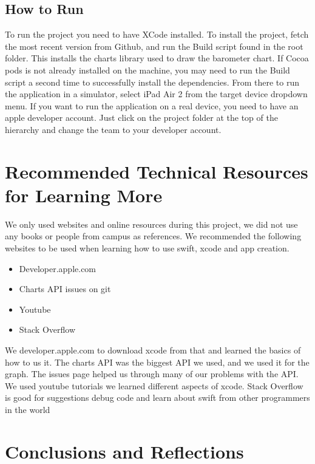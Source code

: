 \documentclass[onecolumn, draftclsnofoot,10pt, compsoc]{IEEEtran}
\begin{document}
\subsection{How to Run}
To run the project you need to have XCode installed.
To install the project, fetch the most recent version from Github, and run the Build script found in the root folder.
This installs the charts library used to draw the barometer chart.
If Cocoa pods is not already installed on the machine, you may need to run the Build script a second time to successfully install the dependencies.
From there to run the application in a simulator, select iPad Air 2 from the target device dropdown menu.
If you want to run the application on a real device, you need to have an apple developer account.
Just click on the project folder at the top of the hierarchy and change the team to your developer account.

\section{Recommended Technical Resources for Learning More}
We only used websites and online resources during this project, we did not use any books or people from campus as references. We recommended the following websites to be used when learning how to use swift, xcode and app creation. 


\begin{itemize}
	\item Developer.apple.com
	\item Charts API issues on git
	\item Youtube 
	\item Stack Overflow
\end{itemize}

    
    We developer.apple.com to download xcode from that and learned the basics of how to us it.
    The charts API was the biggest API we used, and we used it for the graph.
    The issues page helped us through many of our problems with the API.
    We used youtube tutorials we learned different aspects of xcode. 
    Stack Overflow is good for suggestions debug code and learn about swift from other programmers in the world



\section{Conclusions and Reflections}
\end{document}
